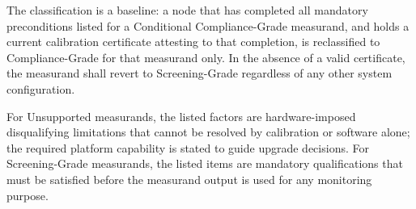 \documentclass[11pt]{article}
\begin{document}
The classification is a baseline: a node that has completed all mandatory preconditions listed for a Conditional Compliance-Grade measurand, and holds a current calibration certificate attesting to that completion, is reclassified to Compliance-Grade for that measurand only. In the absence of a valid certificate, the measurand shall revert to Screening-Grade regardless of any other system configuration.

For Unsupported measurands, the listed factors are hardware-imposed disqualifying limitations that cannot be resolved by calibration or software alone; the required platform capability is stated to guide upgrade decisions. For Screening-Grade measurands, the listed items are mandatory qualifications that must be satisfied before the measurand output is used for any monitoring purpose.
\end{document}
